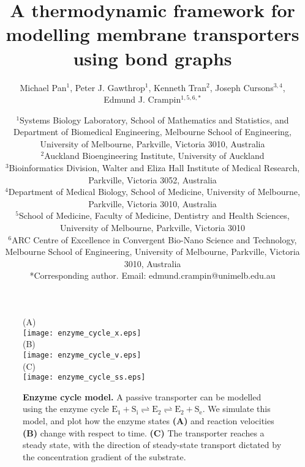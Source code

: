 \documentclass[11pt]{article}
\begin{document}
\title{\textbf{A thermodynamic framework for modelling membrane transporters using bond graphs}}

\author{Michael Pan$^1$, Peter J. Gawthrop$^1$, Kenneth Tran$^2$, Joseph Cursons$^{3,4}$, \\ Edmund J. Crampin$^{1,5,6,*}$}

\date{$^1$Systems Biology Laboratory, School of Mathematics and Statistics, and Department of Biomedical Engineering, Melbourne School of Engineering, University of Melbourne, Parkville, Victoria 3010, Australia \\[0.3cm]
	$^2$Auckland Bioengineering Institute, University of Auckland \\[0.3cm]
	$^3$Bioinformatics Division, Walter and Eliza Hall Institute of Medical Research, Parkville, Victoria 3052, Australia \\[0.3cm]
	$^4$Department of Medical Biology, School of Medicine, University of Melbourne, Parkville, Victoria 3010, Australia  \\[0.3cm]
	$^5$School of Medicine, Faculty of Medicine, Dentistry and Health Sciences, University of Melbourne, Parkville, Victoria 3010 \\[0.3cm]
	$^6$ARC Centre of Excellence in Convergent Bio-Nano Science and Technology, Melbourne School of Engineering, University of Melbourne, Parkville, Victoria 3010, Australia \\[0.3cm]
	*Corresponding author. Email: edmund.crampin@unimelb.edu.au}
\maketitle

\begin{figure}
\centering
(A)\\
\texttt{[image: enzyme\_cycle\_x.eps]}\\
(B)\\
\texttt{[image: enzyme\_cycle\_v.eps]}\\
(C)\\
\texttt{[image: enzyme\_cycle\_ss.eps]}
\caption{\textbf{Enzyme cycle model.} A passive transporter can be modelled using the enzyme cycle $\mathrm{E_1 + S_i \rightleftharpoons E_2 \rightleftharpoons E_2 + S_e}$.	We simulate this model, and plot how the enzyme states \textbf{(A)} and reaction velocities \textbf{(B)} change with respect to time. \textbf{(C)} The transporter reaches a steady state, with the direction of steady-state transport dictated by the concentration gradient of the substrate.}
\end{figure}
\end{document}
